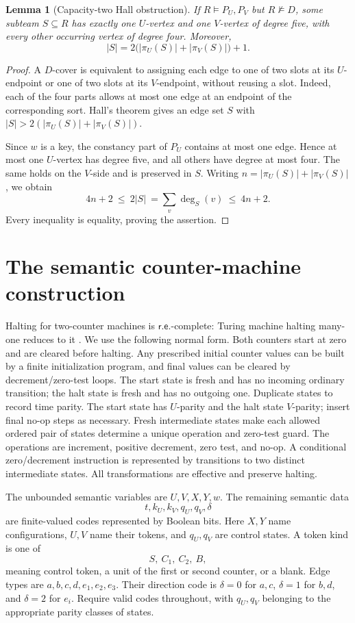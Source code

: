 \documentclass[11pt,a4paper]{article}
\newcommand{\RE}{\mathsf{r.e.}}
\newtheorem{lemma}[theorem]{Lemma}
\theoremstyle{definition}
\begin{document}
\begin{lemma}[Capacity-two Hall obstruction]
\label{lem:hall}
If $R\models P_U,P_V$ but $R\not\models D$, some subteam
$S\subseteq R$ has exactly one $U$-vertex and one $V$-vertex of
degree five, with every other occurring vertex of degree four.
Moreover,
\[
 |S|=2\bigl(|\pi_U(S)|+|\pi_V(S)|\bigr)+1.
\]
\end{lemma}
\begin{proof}
A $D$-cover is equivalent to assigning each edge to one of two
slots at its $U$-endpoint or one of two slots at its $V$-endpoint,
without reusing a slot. Indeed, each of the four parts allows at most
one edge at an endpoint of the corresponding sort. Hall's theorem
\cite{Hall35} gives an edge set $S$ with
$|S|>2(|\pi_U(S)|+|\pi_V(S)|)$.

Since $w$ is a key, the constancy part of $P_U$ contains at most one
edge. Hence at most one $U$-vertex has degree five, and all others have
degree at most four. The same holds on the $V$-side and is preserved
in $S$. Writing $n=|\pi_U(S)|+|\pi_V(S)|$, we obtain
\[
 4n+2\ \leq\ 2|S|\ =\sum_v\deg_S(v)\ \leq\ 4n+2.
\]
Every inequality is equality, proving the assertion.
\end{proof}

\section{The semantic counter-machine construction}
\label{sec:machine}
Halting for two-counter machines is $\RE$-complete: Turing machine
halting many-one reduces to it \cite[Lemma~3]{Dudenhefner22}.
We use the following normal form. Both counters start at zero and are
cleared before halting. Any prescribed initial counter values can be
built by a finite initialization program, and final values can be
cleared by decrement/zero-test loops. The start state is fresh and has
no incoming ordinary transition; the halt state is fresh and has no
outgoing one. Duplicate states to record time parity. The start state
has $U$-parity and the halt state $V$-parity; insert final no-op steps
as necessary. Fresh intermediate states make each allowed ordered
pair of states determine a unique operation and zero-test guard.
The operations are increment, positive decrement, zero test, and
no-op. A conditional zero/decrement instruction is represented by
transitions to two distinct intermediate states. All transformations
are effective and preserve halting.

The unbounded semantic variables are $U,V,X,Y,w$. The remaining
semantic data
\[
 t,k_U,k_V,q_U,q_V,\delta
\]
are finite-valued codes represented by Boolean bits. Here $X,Y$
name configurations, $U,V$ name their tokens, and $q_U,q_V$ are
control states. A token kind is one of
\[
 S,\ C_1,\ C_2,\ B,
\]
meaning control token, a unit of the first or second counter, or a
blank. Edge types are $a,b,c,d,e_1,e_2,e_3$. Their direction code is
$\delta=0$ for $a,c$, $\delta=1$ for $b,d$, and $\delta=2$ for $e_i$.
Require valid codes throughout, with $q_U,q_V$ belonging to the
appropriate parity classes of states.
\end{document}
